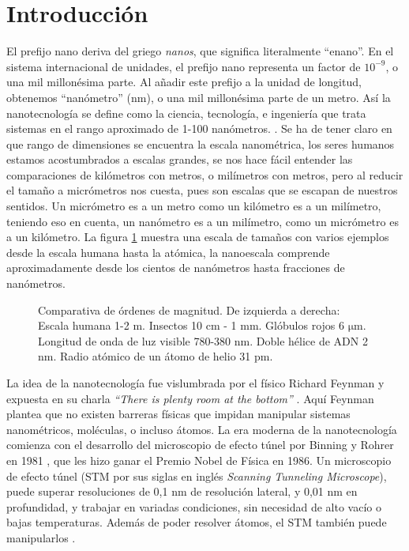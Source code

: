 \chapter*{Introducción}

El prefijo nano deriva del griego \emph{nanos}, que significa literalmente ``enano''. En el sistema internacional de unidades, el prefijo nano representa un factor de $\mathrm{10^{-9}}$, o una mil millonésima parte. Al añadir este prefijo a la unidad de longitud, obtenemos ``nanómetro'' (nm), o una mil millonésima parte de un metro. Así la nanotecnología se define como la ciencia, tecnología, e ingeniería que trata sistemas en el rango aproximado de 1-100 nanómetros. \citep{Haick2013,Gressler2013}. Se ha de tener claro en que rango de dimensiones se encuentra la escala nanométrica, los seres humanos estamos acostumbrados a escalas grandes, se nos hace fácil entender las comparaciones de kilómetros con metros, o milímetros con metros, pero al reducir el tamaño a micrómetros nos cuesta, pues son escalas que se escapan de nuestros sentidos. Un micrómetro es a un metro como un kilómetro es a un milímetro, teniendo eso en cuenta, un nanómetro es a un milímetro, como un micrómetro es a un kilómetro. La figura \ref{fig:scale} muestra una escala de tamaños con varios ejemplos desde la escala humana hasta la atómica, la nanoescala comprende aproximadamente desde los cientos de nanómetros hasta fracciones de nanómetros.

\begin{figure}[h!]
	\centering
	\label{fig:scale}
	\caption[Comparativa de ódenes de magnitud desde metros hasta picometros]{Comparativa de órdenes de magnitud. De izquierda a derecha: Escala humana 1-2 m. Insectos 10 cm - 1 mm. Glóbulos rojos 6 $\mathrm{\mu}$m. Longitud de onda de luz visible 780-380 nm. Doble hélice de ADN 2 nm. Radio atómico de un átomo de helio 31 pm.}
\end{figure}

La idea de la nanotecnología fue vislumbrada por el físico Richard Feynman y expuesta en su charla \emph{``There is plenty room at the bottom''} \citep{Feynman1960}. Aquí Feynman plantea que no existen barreras físicas que impidan manipular sistemas nanométricos, moléculas, o incluso átomos. La era moderna de la nanotecnología comienza con el desarrollo del microscopio de efecto túnel por Binning y Rohrer en 1981 \citep{Binnig1982}, que les hizo ganar el Premio Nobel de Física en 1986. Un microscopio de efecto túnel (STM por sus siglas en inglés \emph{Scanning Tunneling Microscope}), puede superar resoluciones de 0,1 nm de resolución lateral, y 0,01 nm en profundidad, y trabajar en variadas condiciones, sin necesidad de alto vacío o bajas temperaturas. Además de poder resolver átomos, el STM también puede manipularlos \citep{Chen2008}.

